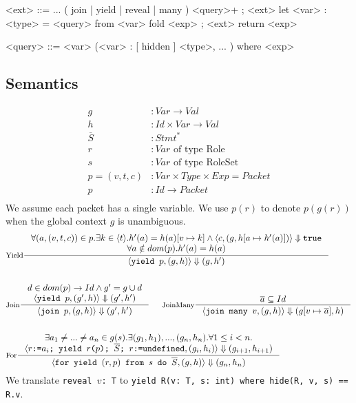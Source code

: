 \documentclass[acmsmall,review,anonymous]{acmart}\settopmatter{printfolios=true,printccs=false,printacmref=false}
\begin{document}
\begin{grammar}

<ext> ::= ...
                \alt ( join | yield | reveal | many ) <query>+ ; <ext>
                \alt let <var> : <type> = <query> from <var> fold <exp> ; <ext>
                \alt return <exp>

<query> ::= <var> (<var> : [ hidden ] <type>, ... ) where <exp>
\end{grammar}

\subsection{Semantics}
\begin{align*}
  g &\colon Var \to Val \\
  h &\colon Id \times Var \to Val \\
  \overline{S} &\colon Stmt^\ast \\
  r &\colon Var \text{ of type Role} \\
  s &\colon Var \text{ of type RoleSet} \\
  p = (v, t, c) &\colon Var \times Type \times Exp = Packet \\
  p &\colon Id \to Packet \\
\end{align*}
We assume each packet has a single variable. We use $p(r)$ to denote $p(g(r))$ when the global context $g$ is unambiguous.
\begin{align*}
  &\inference[Yield]{
    \forall (a, (v, t, c)) \in p . \exists k \in \langle t \rangle . h'(a) = h(a)[v \mapsto k] \land \langle c, (g, h[a \mapsto h'(a)]) \rangle \Downarrow \texttt{true} \\
    \forall a \notin dom(p) . h'(a) = h(a)
  }{
    \langle \texttt{yield $p$}, (g, h) \rangle \Downarrow (g, h')
  }\\ \\
  &\inference[Join]{
    d \in dom(p) \to Id \land g' = g \cup d\\
    \langle \texttt{yield $p$}, (g', h) \rangle \Downarrow (g', h')
  }{
    \langle \texttt{join $p$}, (g, h) \rangle \Downarrow (g', h')
  }\;\;\;\;\;
  \inference[JoinMany]{
    \overline{a} \subseteq Id
  }{
    \langle \texttt{join many $v$}, (g, h) \rangle \Downarrow (g[v \mapsto \overline{a}], h)
  }\\ \\
  &\inference[For]{
    \exists a_1 \neq ... \neq a_n \in g(s) . \exists (g_1, h_1), ..., (g_n, h_n) . \forall 1 \leq i < n . \\
    \langle \texttt{$r$:=$a_i$; yield $r$($p$); $\overline{S}$; $r$:=undefined}, (g_i, h_i) \rangle \Downarrow (g_{i+1}, h_{i+1})
  }{
    \langle \texttt{for yield $(r, p)$ from $s$ do $\overline{S}$}, (g, h) \rangle \Downarrow (g_n, h_n)
  } \\
\end{align*}
We translate \texttt{reveal $v$: T} to \texttt{yield R(v: T, s: int) where hide(R, v, s) == R.v}.
\end{document}
